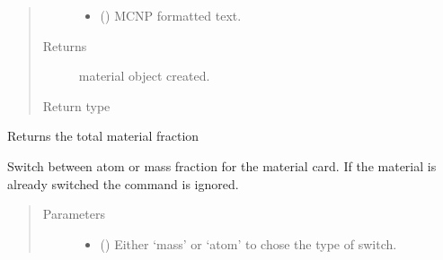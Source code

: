 \documentclass[letterpaper,10pt,english]{sphinxmanual}
\begin{document}
\begin{fulllineitems}
\begin{fulllineitems}
\begin{quote}
\begin{description}
\begin{itemize}
\item {} 
 (\sphinxstyleliteralemphasis{\sphinxupquote{{[}}}\sphinxstyleliteralemphasis{\sphinxupquote{{]}}}) \textendash{} MCNP formatted text.

\end{itemize}

\item[{Returns}] \leavevmode
material object created.

\item[{Return type}] \leavevmode
{\hyperref[\detokenize{api/inputgeneration:matreader.Material}]{}}

\end{description}\end{quote}

\end{fulllineitems}


\begin{fulllineitems}
\label{\detokenize{api/inputgeneration:matreader.Material.get_tot_fraction}}
Returns the total material fraction

\end{fulllineitems}


\begin{fulllineitems}
\label{\detokenize{api/inputgeneration:matreader.Material.switch_fraction}}
Switch between atom or mass fraction for the material card.
If the material is already switched the command is ignored.
\begin{quote}\begin{description}
\item[{Parameters}] \leavevmode\begin{itemize}
\item {} 
 () \textendash{} Either ‘mass’ or ‘atom’ to chose the type of switch.


\end{itemize}
\end{description}
\end{quote}
\end{fulllineitems}
\end{fulllineitems}
\end{document}
